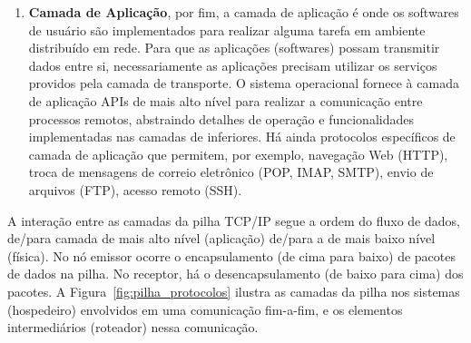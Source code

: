 \documentclass[	12pt, Times, openright, twoside, a4paper, english, brazil]{abntex2}
\begin{document}
\begin{enumerate}
\item \textbf{Camada de Aplicação}, por fim, a camada de aplicação é onde os softwares de usuário são implementados para realizar alguma tarefa em ambiente distribuído em rede. Para que as aplicações (softwares) possam transmitir dados entre si, necessariamente as aplicações precisam utilizar os serviços providos pela camada de transporte. O sistema operacional fornece à camada de aplicação APIs de mais alto nível para realizar a comunicação entre processos remotos, abstraindo detalhes de operação e funcionalidades implementadas nas camadas de inferiores. Há ainda protocolos específicos de camada de aplicação que permitem, por exemplo, navegação Web (HTTP), troca de mensagens de correio eletrônico (POP, IMAP, SMTP), envio de arquivos (FTP), acesso remoto (SSH).

\end{enumerate}


A interação entre as camadas da pilha TCP/IP segue a ordem do fluxo de dados, de/para camada de mais alto nível (aplicação) de/para a de mais baixo nível (física). No nó emissor ocorre o encapsulamento (de cima para baixo) de pacotes de dados na pilha. No receptor, há o desencapsulamento (de baixo para cima) dos pacotes. A Figura~\ref{fig:pilha_protocolos} ilustra as camadas da pilha nos sistemas (hospedeiro) envolvidos em uma comunicação fim-a-fim, e os elementos intermediários (roteador) nessa comunicação.
\end{document}
